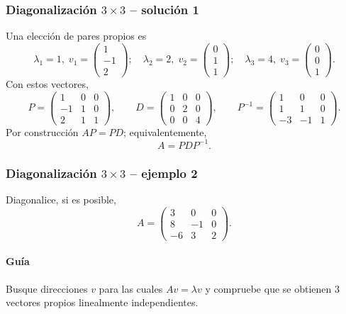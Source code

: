 \subsubsection*{Diagonalización $3\times 3$ -- solución 1}
\scriptsize
Una elección de pares propios es
\[
\lambda_1=1,\;v_1=\begin{pmatrix}1\\-1\\2\end{pmatrix};\quad \lambda_2=2,\;v_2=\begin{pmatrix}0\\1\\1\end{pmatrix};\quad \lambda_3=4,\;v_3=\begin{pmatrix}0\\0\\1\end{pmatrix}.
\]
Con estos vectores,
\[
P=\begin{pmatrix}1 & 0 & 0\\-1 & 1 & 0\\2 & 1 & 1\end{pmatrix},\qquad D=\begin{pmatrix}1 & 0 & 0\\0 & 2 & 0\\0 & 0 & 4\end{pmatrix},\qquad P^{-1}=\begin{pmatrix}1 & 0 & 0\\1 & 1 & 0\\-3 & -1 & 1\end{pmatrix}.
\]
Por construcción $AP=PD$; equivalentemente,
\[
\boxed{A=PDP^{-1}}.
\]


\subsubsection*{Diagonalización $3\times 3$ -- ejemplo 2}

Diagonalice, si es posible,
\[
A=\begin{pmatrix}3 & 0 & 0\\8 & -1 & 0\\-6 & 3 & 2\end{pmatrix}.
\]

\paragraph{Guía}
Busque direcciones $v$ para las cuales $Av=\lambda v$ y compruebe que se obtienen $3$ vectores propios linealmente independientes.



